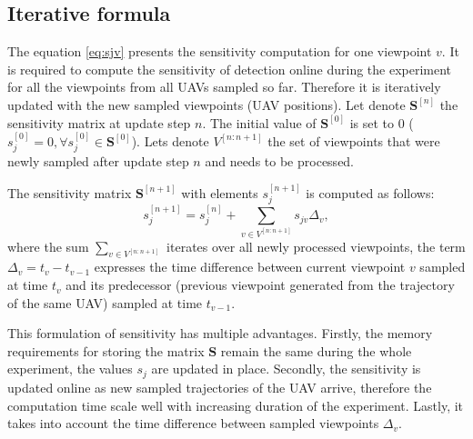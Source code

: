\subsection{Iterative formula}
The equation \ref{eq:sjv} presents the sensitivity computation for one viewpoint $v$. 
It is required to compute the sensitivity of detection online during the experiment for all the viewpoints from all \ac{UAV}s sampled so far. 
Therefore it is iteratively updated with the new sampled viewpoints (\ac{UAV} positions).
Let denote $\mathbf{S}^{[n]}$ the sensitivity matrix at update step $n$.
The initial value of $\mathbf{S}^{[0]}$ is set to $0$ ($s_{j}^{[0]} = 0 ,\forall s_{j}^{[0]} \in \mathbf{S}^{[0]}$).
Lets denote $V^{[n:n+1]}$ the set of viewpoints that were newly sampled after update step $n$ and needs to be processed. 

The sensitivity matrix $\mathbf{S}^{[n+1]}$ with elements $s_{j}^{[n+1]}$ is computed as follows:
\begin{equation}
  s_{j}^{[n+1]} = s_{j}^{[n]} + \sum_{v \in V^{[n:n+1]}} s_{jv} \Delta_{v}, 
  \label{eq:sen_iter}
\end{equation}
where the sum $\sum_{v \in V^{[n:n+1]}}$ iterates over all newly processed viewpoints, 
the term $\Delta_{v} = t_{v} - t_{v-1}$ expresses the time difference between current viewpoint $v$ sampled at time $t_{v}$ and its predecessor (previous viewpoint generated from the trajectory of the same \ac{UAV}) sampled at time $t_{v-1}$. 

This formulation of sensitivity has multiple advantages.
Firstly, the memory requirements for storing the matrix $\mathbf{S}$ remain the same during the whole experiment, the values $s_{j}$ are updated in place.
Secondly, the sensitivity is updated online as new sampled trajectories of the \ac{UAV} arrive, therefore the computation time scale well with increasing duration of the experiment.
Lastly, it takes into account the time difference between sampled viewpoints $\Delta_{v}$.

